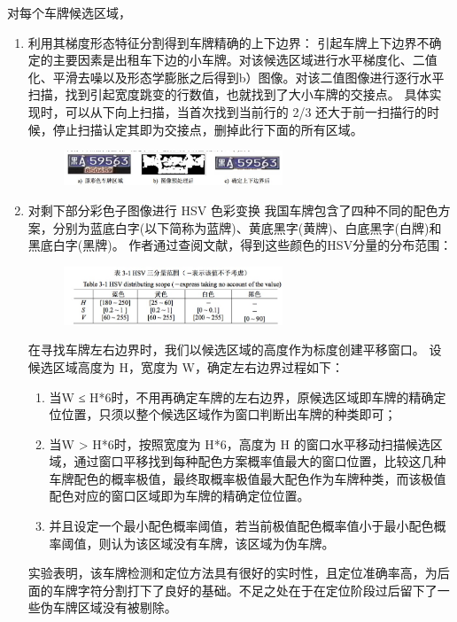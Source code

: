 \begin{enumerate}
对每个车牌候选区域，
\begin{enumerate}
\item
利用其梯度形态特征分割得到车牌精确的上下边界：
引起车牌上下边界不确定的主要因素是出租车下边的小车牌。对该候选区域进行水平梯度化、二值化、平滑去噪以及形态学膨胀之后得到b）图像。对该二值图像进行逐行水平扫描，找到引起宽度跳变的行数值，也就找到了大小车牌的交接点。
具体实现时，可以从下向上扫描，当首次找到当前行的 2/3 还大于前一扫描行的时候，停止扫描认定其即为交接点，删掉此行下面的所有区域。
\begin{figure}[H]
    \centering 
    \includegraphics[width=0.618\textwidth]{image/2_5_3.jpg}    
    \label{logic}
\end{figure}
\item
对剩下部分彩色子图像进行 HSV 色彩变换
我国车牌包含了四种不同的配色方案，分别为蓝底白字(以下简称为蓝牌)、黄底黑字(黄牌)、白底黑字(白牌)和黑底白字(黑牌)。 作者通过查阅文献，得到这些颜色的HSV分量的分布范围：
\begin{figure}[H]
    \centering 
    \includegraphics[width=0.618\textwidth]{image/2_5_4.jpg}    
    \label{logic}
\end{figure}
在寻找车牌左右边界时，我们以候选区域的高度作为标度创建平移窗口。 设候选区域高度为 H，宽度为 W，确定左右边界过程如下：
\begin{enumerate}
\item
当W ≤ H*6时，不用再确定车牌的左右边界，原候选区域即车牌的精确定位位置，只须以整个候选区域作为窗口判断出车牌的种类即可；
\item
当W > H*6时，按照宽度为 H*6，高度为 H 的窗口水平移动扫描候选区域，通过窗口平移找到每种配色方案概率值最大的窗口位置，比较这几种车牌配色的概率极值，最终取概率极值最大配色作为车牌种类，而该极值配色对应的窗口区域即为车牌的精确定位位置。 
\item
并且设定一个最小配色概率阈值，若当前极值配色概率值小于最小配色概率阈值，则认为该区域没有车牌，该区域为伪车牌。
\end{enumerate}
实验表明，该车牌检测和定位方法具有很好的实时性，且定位准确率高，为后面的车牌字符分割打下了良好的基础。不足之处在于在定位阶段过后留下了一些伪车牌区域没有被剔除。 
\end{enumerate}
\end{enumerate}
